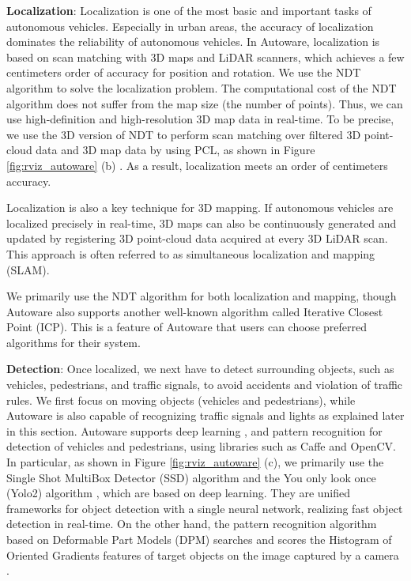 \textbf{Localization}:
Localization is one of the most basic and important tasks of autonomous
vehicles.
Especially in urban areas, the accuracy of localization dominates the
reliability of autonomous vehicles.
In Autoware, localization is based on scan matching with 3D maps and
LiDAR scanners, which achieves a few centimeters order of accuracy for
position and rotation. 
We use the NDT \cite{biber2003normal} algorithm to solve the
localization problem.
The computational cost of the NDT algorithm does not suffer from the map
size (the number of points).
Thus, we can use high-definition and high-resolution 3D map data in
real-time.
To be precise, we use the 3D version of NDT to perform scan matching
over filtered 3D point-cloud data and 3D map data by using PCL, as shown
in Figure \ref{fig:rviz_autoware} (b) \cite{magnusson2009three}.
As a result, localization meets an order of centimeters accuracy.

Localization is also a key technique for 3D mapping.
If autonomous vehicles are localized precisely in real-time, 3D maps can
also be continuously generated and updated by registering 3D point-cloud
data acquired at every 3D LiDAR scan.
This approach is often referred to as simultaneous localization and
mapping (SLAM).

We primarily use the NDT algorithm for both localization and mapping,
though Autoware also supports another well-known algorithm called
Iterative Closest Point (ICP).
This is a feature of Autoware that users can choose preferred algorithms
for their system.

  
\textbf{Detection}:
Once localized, we next have to detect surrounding objects, such as
vehicles, pedestrians, and traffic signals, to avoid accidents and
violation of traffic rules.
We first focus on moving objects (vehicles and pedestrians), while
Autoware is also capable of recognizing traffic signals and lights as
explained later in this section. 
Autoware supports deep learning \cite{liu2016ssd},
\cite{DBLP:journals/corr/RedmonF16} and pattern recognition
\cite{felzenszwalb2010object} for detection of vehicles and pedestrians,
using libraries such as Caffe and OpenCV. 
In particular, as shown in Figure \ref{fig:rviz_autoware} (c), we primarily use the Single Shot MultiBox Detector (SSD)
algorithm \cite{liu2016ssd} and the You only look once (Yolo2) algorithm
\cite{DBLP:journals/corr/RedmonF16}, which are based on deep learning.
They are unified frameworks for object detection with a single neural
network, realizing fast object detection in real-time.
On the other hand, the pattern recognition algorithm based on Deformable
Part Models (DPM) \cite{felzenszwalb2010object} searches and scores the
Histogram of Oriented Gradients features of target objects on the image
captured by a camera \cite{dalal2005histograms}.


